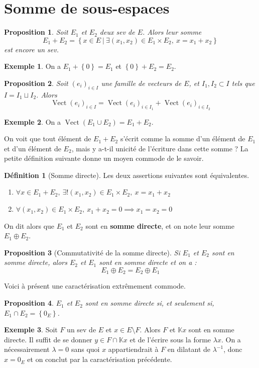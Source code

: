 \documentclass[french]{book}
\newcommand{\K}{\mathbb{K}}
\newcommand{\inv}{^{-1}}
\theoremstyle{plain}
\newtheorem{prop}{Proposition}[chapter]
\theoremstyle{definition}
\newtheorem{dfn}{Définition}[chapter]
\newtheorem{exa}{Exemple}[chapter]
\theoremstyle{remark}
\DeclareMathOperator{\vect}{Vect}
\begin{document}
\section{Somme de sous-espaces} %
\begin{prop}
	Soit $E_1$ et $E_2$ deux sev de $E$. Alors leur somme $$E_1+E_2=\left\{x\in E\ | \ \exists(x_1,x_2)\in E_1\times E_2,\ x=x_1+x_2\right\}$$ est encore un sev.
\end{prop}
\begin{exa}
	On a $E_1+\left\{0\right\}=E_1$ et $\left\{0\right\}+E_2=E_2$.
\end{exa}
\begin{prop}
	Soit $(e_i)_{i\in I}$ une famille de vecteurs de $E$, et $I_1,I_2\subset I$ tels que $I=I_1\sqcup I_2$. Alors $$\vect(e_i)_{i\in I}=\vect(e_i)_{i\in I_1}+\vect(e_i)_{i\in I_2}$$
\end{prop}
\begin{exa}
	On a $\vect(E_1\cup E_2)=E_1+E_2$.
\end{exa}
On voit que tout élément de $E_1+E_2$ s'écrit comme la somme d'un élément de $E_1$ et d'un élément de $E_2$, mais y a-t-il unicité de l'écriture dans cette somme ? La petite définition suivante donne un moyen commode de le savoir.
\begin{dfn}[Somme directe]
	Les deux assertions suivantes sont équivalentes.
	\begin{enumerate}
		\item $\forall x\in E_1+E_2,\ \exists!(x_1,x_2)\in E_1\times E_2,\ x=x_1+x_2$
		\item $\forall(x_1,x_2)\in E_1\times E_2,\ x_1+x_2=0\implies x_1=x_2=0$
	\end{enumerate}
	On dit alors que $E_1$ et $E_2$ sont en \textbf{somme directe}, et on note leur somme $E_1\oplus E_2$.
\end{dfn}
\begin{prop}[Commutativité de la somme directe]
	Si $E_1$ et $E_2$ sont en somme directe, alors $E_2$ et $E_1$ sont en somme directe et on a : $$E_1\oplus E_2=E_2\oplus E_1$$
\end{prop}
Voici à présent une caractérisation extrêmement commode.
\begin{prop}
	$E_1$ et $E_2$ sont en somme directe si, et seulement si, $E_1\cap E_2=\left\{0_E\right\}$.
\end{prop}
\begin{exa}
	Soit $F$ un sev de $E$ et $x\in E\setminus F$. Alors $F$ et $\K x$ sont en somme directe. Il suffit de se donner $y\in F\cap \K x$ et de l'écrire sous la forme $\lambda x$. On a nécessairement $\lambda=0$ sans quoi $x$ appartiendrait à $F$ en dilatant de $\lambda\inv$, donc $x=0_E$ et on conclut par la caractérisation précédente.
\end{exa}
\end{document}

